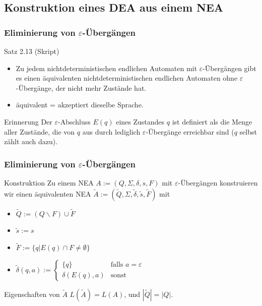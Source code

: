 \subsection{Konstruktion eines DEA aus einem NEA}
\begin{frame}
	\frametitle{Eliminierung von $\varepsilon$-Übergängen}
	\begin{block}{Satz 2.13 (Skript)}
	\begin{itemize}
	 \item Zu jedem nichtdeterministischen endlichen Automaten mit \(\varepsilon\)-Übergängen gibt es einen äquivalenten nichtdeterministischen
	 endlichen Automaten ohne \(\varepsilon\)-Übergänge, der nicht mehr Zustände hat.
	 \item äquivalent = akzeptiert dieselbe Sprache.
	\end{itemize}
	\end{block}
	\begin{block}{Erinnerung}
		Der \(\varepsilon\)-Abschluss $E(q)$ eines Zustandes $q$ ist definiert als die Menge aller Zustände, die von $q$ aus durch lediglich \(\varepsilon\)-Übergänge erreichbar sind ($q$ selbst zählt auch dazu).
	\end{block}
\end{frame}
\begin{frame}
\frametitle{Eliminierung von $\varepsilon$-Übergängen}
	\begin{block}{Konstruktion}
	Zu einem NEA \(A := (Q, \Sigma, \delta, s, F)\) mit \(\varepsilon\)-Übergängen konstruieren wir einen 
	  äquivalenten NEA \(\tilde{A} := (\tilde{Q}, \Sigma, \tilde{\delta}, \tilde{s}, \tilde{F})\) mit
	 \begin{itemize}
	 \item \(\tilde{Q} := \left(Q\backslash F\right)\cup\tilde{F}\)
	 \item \(\tilde{s} := s\)
	 \item \(\tilde{F} := \{q|E(q)\cap F \neq \emptyset\}\)
	 \item $\tilde{\delta}(q,a) := 
	 \begin{cases}
	  \{q\}			& \text{falls $a = \varepsilon$} \\
	 \delta(E(q),a)	& \text{sonst}
	 \end{cases}$
	 \end{itemize}
	\end{block}
	\begin{block}{Eigenschaften von \(\tilde{A}\)}
	 \(L(\tilde{A}) = L(A)\), und \(|\tilde{Q}| = |Q|\).
	\end{block}

\end{frame}
